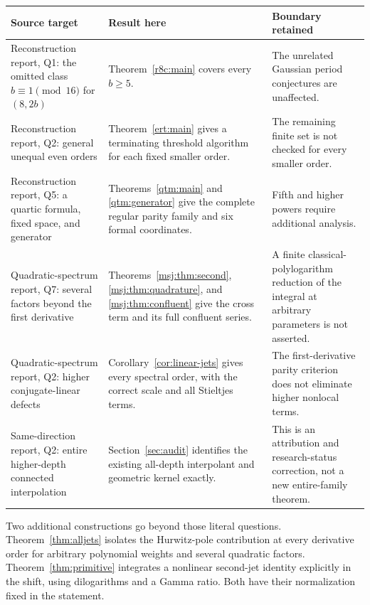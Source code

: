 \documentclass[11pt,a4paper]{article}
\numberwithin{equation}{section}
\theoremstyle{plain}
\theoremstyle{definition}
\theoremstyle{remark}
\begin{document}
\begin{longtable}{@{}>{\raggedright\arraybackslash}p{}>{\raggedright\arraybackslash}p{}>{\raggedright\arraybackslash}p{}@{}}
\toprule
Source target & Result here & Boundary retained\\
\midrule
\endhead
Reconstruction report, Q1: the omitted class
$b\equiv1\pmod{16}$ for $(8,2b)$ \cite{Reconstruction}
& Theorem~\ref{r8c:main} covers every $b\ge5$.
& The unrelated Gaussian period conjectures are unaffected.\\[5pt]
Reconstruction report, Q2: general unequal even orders
& Theorem~\ref{ert:main} gives a terminating threshold algorithm for
each fixed smaller order.
& The remaining finite set is not checked for every smaller order.\\[5pt]
Reconstruction report, Q5: a quartic formula, fixed space, and generator
& Theorems~\ref{qtm:main} and \ref{qtm:generator} give the complete
regular parity family and six formal coordinates.
& Fifth and higher powers require additional analysis.\\[5pt]
Quadratic-spectrum report, Q7: several factors beyond the first derivative
\cite{Quadratic}
& Theorems~\ref{msj:thm:second}, \ref{msj:thm:quadrature}, and
\ref{msj:thm:confluent} give the cross term and its full confluent series.
& A finite classical-polylogarithm reduction of the integral at arbitrary
parameters is not asserted.\\[5pt]
Quadratic-spectrum report, Q2: higher conjugate-linear defects
& Corollary~\ref{cor:linear-jets} gives every spectral order, with the
correct scale and all Stieltjes terms.
& The first-derivative parity criterion does not eliminate higher
nonlocal terms.\\[5pt]
Same-direction report, Q2: entire higher-depth connected interpolation
\cite{SameDirection}
& Section~\ref{sec:audit} identifies the existing all-depth interpolant
and geometric kernel exactly.
& This is an attribution and research-status correction, not a new
entire-family theorem.\\
\bottomrule
\end{longtable}

Two additional constructions go beyond those literal questions.
Theorem~\ref{thm:alljets} isolates the Hurwitz-pole contribution at every
derivative order for arbitrary polynomial weights and several quadratic
factors.  Theorem~\ref{thm:primitive} integrates a nonlinear second-jet
identity explicitly in the shift, using dilogarithms and a Gamma ratio.
Both have their normalization fixed in the statement.
\end{document}

